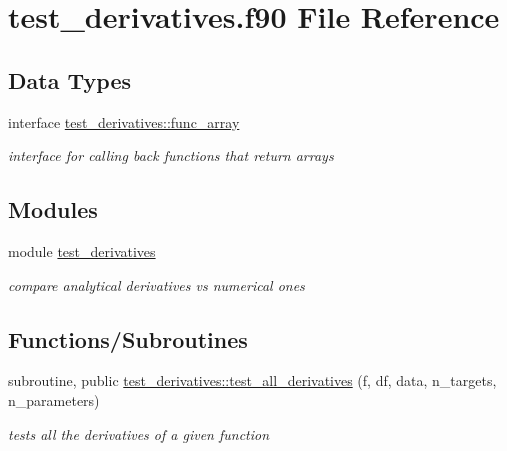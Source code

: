 \hypertarget{test__derivatives_8f90}{}\section{test\+\_\+derivatives.\+f90 File Reference}
\label{test__derivatives_8f90}
\subsection*{Data Types}
\begin{DoxyCompactItemize}
\item 
interface \hyperlink{interfacetest__derivatives_1_1func__array}{test\+\_\+derivatives\+::func\+\_\+array}
\begin{DoxyCompactList}\small\item\em interface for calling back functions that return arrays \end{DoxyCompactList}\end{DoxyCompactItemize}
\subsection*{Modules}
\begin{DoxyCompactItemize}
\item 
module \hyperlink{namespacetest__derivatives}{test\+\_\+derivatives}
\begin{DoxyCompactList}\small\item\em compare analytical derivatives vs numerical ones \end{DoxyCompactList}\end{DoxyCompactItemize}
\subsection*{Functions/\+Subroutines}
\begin{DoxyCompactItemize}
\item 
subroutine, public \hyperlink{namespacetest__derivatives_a18e87b90fff445aa01dfe6a5ec160554}{test\+\_\+derivatives\+::test\+\_\+all\+\_\+derivatives} (f, df, data, n\+\_\+targets, n\+\_\+parameters)
\begin{DoxyCompactList}\small\item\em tests all the derivatives of a given function \end{DoxyCompactList}\end{DoxyCompactItemize}
